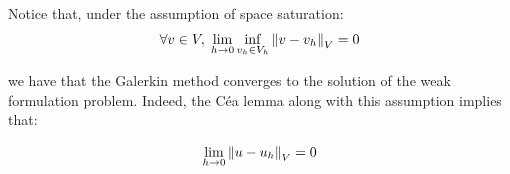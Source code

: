 \begin{fremark}
    Notice that, under the assumption of space saturation:
    $$\forall v \in V, \; \lim_{h \to 0} \inf_{v_h \in V_h} \left\|v - v_h\right\|_V = 0$$

    we have that the Galerkin method converges to the solution of the weak formulation problem. Indeed,
    the Céa lemma along with this assumption implies that:

    $$\lim_{h \to 0} \left\|u - u_h\right\|_V = 0$$

\end{fremark}

